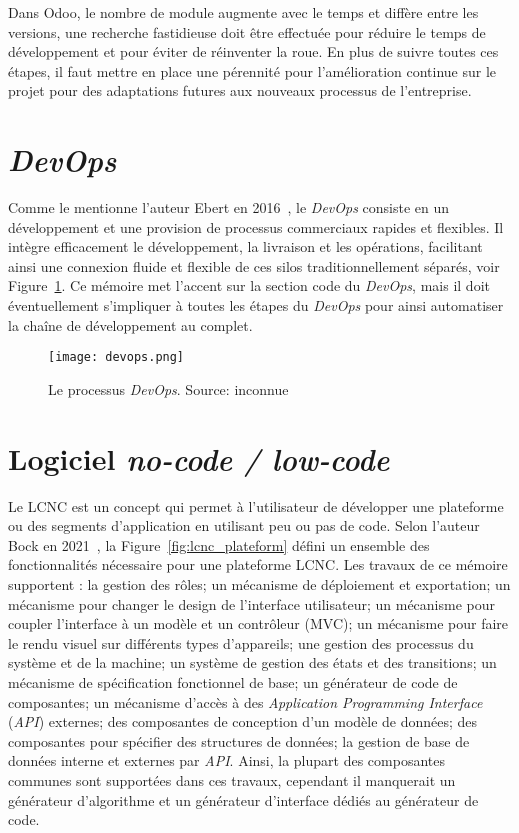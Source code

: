 Dans Odoo, le nombre de module augmente avec le temps et diffère entre les versions, une recherche fastidieuse doit être effectuée pour réduire le temps de développement et pour éviter de réinventer la roue. En plus de suivre toutes ces étapes, il faut mettre en place une pérennité pour l’amélioration continue sur le projet pour des adaptations futures aux nouveaux processus de l'entreprise.

\section{\textit{DevOps}}\label{devops_ref}

Comme le mentionne l'auteur Ebert en 2016~\cite{ebert2016devops}, le \textit{DevOps} consiste en un développement et une provision de processus commerciaux rapides et flexibles. Il intègre efficacement le développement, la livraison et les opérations, facilitant ainsi une connexion fluide et flexible de ces silos traditionnellement séparés, voir Figure~\ref{fig:devops}. Ce mémoire met l'accent sur la section code du \textit{DevOps}, mais il doit éventuellement s'impliquer à toutes les étapes du \textit{DevOps} pour ainsi automatiser la chaîne de développement au complet.

\begin{figure}[htb]
\centering
\texttt{[image: devops.png]}
\caption{Le processus \textit{DevOps}. Source: inconnue}
\label{fig:devops}
\end{figure}


\section{Logiciel \textit{no-code / low-code}}


Le LCNC est un concept qui permet à l’utilisateur de développer une plateforme ou des segments d'application en utilisant peu ou pas de code. Selon l'auteur Bock en 2021~\cite{LC_bock_2021}, la Figure~\ref{fig:lcnc_plateform} défini un ensemble des fonctionnalités nécessaire pour une plateforme LCNC. Les travaux de ce mémoire supportent : la gestion des rôles; un mécanisme de déploiement et exportation; un mécanisme pour changer le design de l'interface utilisateur; un mécanisme pour coupler l'interface à un modèle et un contrôleur (MVC); un mécanisme pour faire le rendu visuel sur différents types d'appareils; une gestion des processus du système et de la machine; un système de gestion des états et des transitions; un mécanisme de spécification fonctionnel de base; un générateur de code de composantes; un mécanisme d'accès à des \textit{Application Programming Interface} (\textit{API}) externes; des composantes de conception d'un modèle de données; des composantes pour spécifier des structures de données; la gestion de base de données interne et externes par \textit{API}. Ainsi, la plupart des composantes communes sont supportées dans ces travaux, cependant il manquerait un générateur d'algorithme et un générateur d'interface dédiés au générateur de code.

